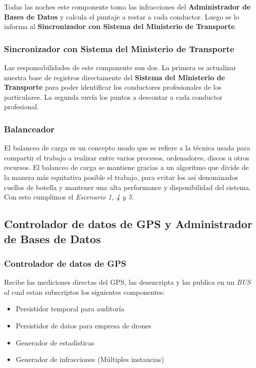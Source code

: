Todas las noches este componente toma las infracciones del \textbf{Administrador de Bases de Datos} 
y calcula el puntaje a restar a cada conductor. Luego se lo informa al
\textbf{Sincronizador con Sistema del Ministerio de Transporte}.

\subsubsection{Sincronizador con Sistema del Ministerio de Transporte}

Las responsabilidades de este componente son dos.
La primera es actualizar nuestra base de registros directamente del \textbf{Sistema del Ministerio de Transporte}
para poder identificar los conductores profesionales de los particulares. 
La segunda envía los puntos a descontar a cada conductor profesional.

\subsubsection{Balanceador}
El balanceo de carga es un concepto usado que se refiere a la técnica usada para compartir el trabajo
a realizar entre varios procesos, ordenadores, discos u otros recursos.
El balanceo de carga se mantiene gracias a un algoritmo que divide de la manera más equitativa posible
el trabajo, para evitar los así denominados cuellos de botella y mantener una 
alta performance y disponibilidad del sistema. Con esto cumplimos el \textit{Escenario 
1, 4 y 5}.


\subsection{Controlador de datos de GPS y Administrador de Bases de Datos}

\subsubsection{Controlador de datos de GPS}

Recibe las mediciones directas del GPS, las desencripta y las publica en un \textit{BUS} 
al cual estan subscriptos los siguientes componentes:

\begin{itemize}
  \item Persistidor temporal para auditoría
  \item Persistidor de datos para empresa de drones
  \item Generador de estadísticas
  \item Generador de infracciones (Múltiples instancias)
\end{itemize}

